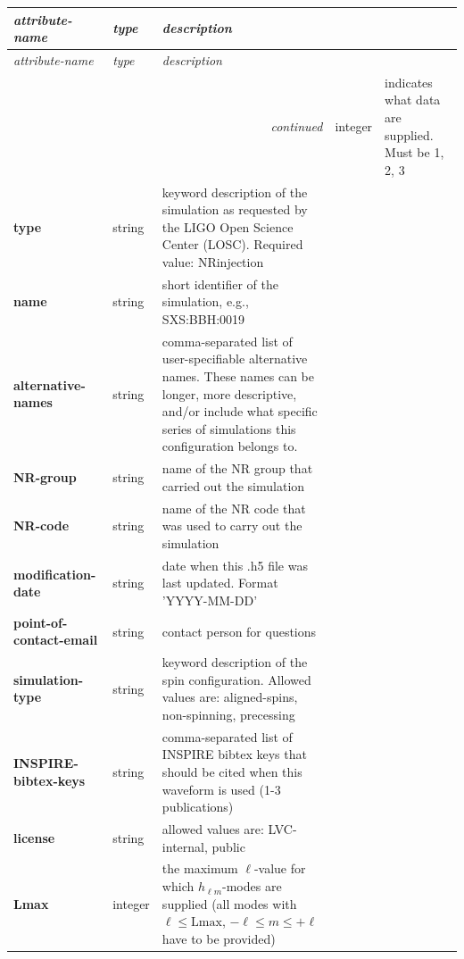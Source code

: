 \documentclass[11pt,tightenlines,article,amssymb,amsmath,amsfonts,superscriptaddress,nofootinbib]{revtex4}
\begin{document}
\renewcommand*{\arraystretch}{1.3} %
\begin{longtable}{|p{3.4cm}|p{1.6cm}|p{11.2cm}|}
  \hline  \emph{attribute-name} & \emph{type} & \emph{description} \\ \hline
  \endhead
  \hline  \emph{attribute-name} & \emph{type} & \emph{description} \\ \hline
\endfirsthead
\hline 
 \multicolumn{3}{r}{\emph{continued}}
\endfoot
\hline
\endlastfoot
  \textbf{Format} & integer & indicates what data are supplied. Must be 1, 2, 3\\
  \textbf{type} & string & keyword description of the simulation as requested by the LIGO Open Science Center (LOSC). Required value: NRinjection\\
  \textbf{name} & string  & short identifier of the simulation, e.g., SXS:BBH:0019\\


\textbf{alternative-names} & string & comma-separated list of user-specifiable alternative names. These names can be longer, more descriptive, and/or include what specific series of simulations this configuration belongs to.\\

\textbf{NR-group} & string &  name of the NR group that carried out the simulation\\

\textbf{NR-code} & string &  name of the NR code that was used to carry out the simulation\\

\textbf{modification-date} & string & date when this .h5 file was last updated. Format 'YYYY-MM-DD'\\

\textbf{point-of-contact-email} & string & contact person for questions\\

\textbf{simulation-type} & string & keyword description of the spin configuration. Allowed values are: aligned-spins, non-spinning, precessing\\

\textbf{INSPIRE-bibtex-keys} & string & comma-separated list of INSPIRE bibtex keys that should be cited when this waveform is used (1-3 publications)\\

\textbf{license} & string & allowed values are: LVC-internal, public\\

\textbf{Lmax} & integer & the maximum $\ell$-value for which  $h_{\ell m}$-modes are supplied (all modes with $\ell \leq \mathrm{Lmax}$, $-\ell \leq m \leq +\ell$ have to be provided)\\


\end{longtable}
\end{document}
